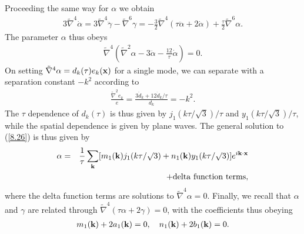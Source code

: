 Proceeding the same way for $\alpha$  we obtain 
%
\begin{eqnarray}
3\tilde{\nabla}^4\dot{\alpha}=3\tilde{\nabla}^4\ddot{\gamma}-\tilde{\nabla}^6\gamma
=-\frac{3}{2}\tilde{\nabla}^4(\tau\ddot{\alpha}+2\dot{\alpha})+\frac{\tau}{2}\tilde{\nabla}^6\alpha.
\label{8.25}
\end{eqnarray}
%
The parameter $\alpha$ thus obeys
%
\begin{eqnarray}
\tilde{\nabla}^4\left(\tilde{\nabla}^2\alpha-3\ddot{\alpha}-\frac{12}{\tau}\dot{\alpha}\right)=0.
\label{8.26}
\end{eqnarray}
%
On setting $\tilde{\nabla}^4\alpha=d_k(\tau)e_k({\bf x})$ for a single mode, we can separate with a separation constant $-k^2$ according to
%
\begin{eqnarray}
\frac{\tilde{\nabla}^2e_k}{e}=\frac{3\ddot{d}_k+12\dot{d}_k/\tau}{d_k}=-k^2.
\label{8.27}
\end{eqnarray}
%
The $\tau$ dependence of $d_k(\tau)$ is thus given by $j_1(k\tau/\surd{3})/\tau$ and  $y_1(k\tau/\surd{3})/\tau$, while the spatial dependence is given by plane waves. The general solution to (\ref{8.26}) is thus given by 
%
\begin{eqnarray}
\alpha&=&\frac{1}{\tau}\sum_{\bf k}[m_1({\bf k})j_1(k\tau/\surd{3})+n_1({\bf k})y_1(k\tau/\surd{3})]e^{i{\bf k}\cdot{\bf x}}
\nonumber\\
&& + {\rm delta~function~terms},
\label{8.28}
\end{eqnarray}
%
where the delta function terms are solutions to $\tilde{\nabla}^4\alpha=0$. Finally, we recall that $\alpha$ and $\gamma$ are related through $\tilde{\nabla}^4(\tau\alpha+2\gamma)=0$,  with the coefficients  thus obeying
%
\begin{eqnarray}
m_1({\bf k})+2a_1({\bf k})=0,\quad n_1({\bf k})+2b_1({\bf k})=0.
\label{8.29}
\end{eqnarray}
%


